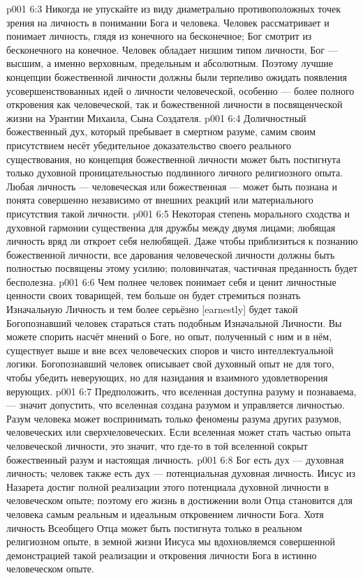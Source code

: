 \vs p001 6:3 Никогда не упускайте из виду диаметрально противоположных точек зрения на личность в понимании Бога и человека. Человек рассматривает и понимает личность, глядя из конечного на бесконечное; Бог смотрит из бесконечного на конечное. Человек обладает низшим типом личности, Бог --- высшим, а именно верховным, предельным и абсолютным. Поэтому лучшие концепции божественной личности должны были терпеливо ожидать появления усовершенствованных идей о личности человеческой, особенно --- более полного откровения как человеческой, так и божественной личности в посвященческой жизни на Урантии Михаила, Сына Создателя.
\vs p001 6:4 \pc Доличностный божественный дух, который пребывает в смертном разуме, самим своим присутствием несёт убедительное доказательство своего реального существования, но концепция божественной личности может быть постигнута только духовной проницательностью подлинного личного религиозного опыта. Любая личность --- человеческая или божественная --- может быть познана и понята совершенно независимо от внешних реакций или материального присутствия такой личности.
\vs p001 6:5 Некоторая степень морального сходства и духовной гармонии существенна для дружбы между двумя лицами; любящая личность вряд ли откроет себя нелюбящей. Даже чтобы приблизиться к познанию божественной личности, все дарования человеческой личности должны быть полностью посвящены этому усилию; половинчатая, частичная преданность будет бесполезна.
\vs p001 6:6 Чем полнее человек понимает себя и ценит личностные ценности своих товарищей, тем больше он будет стремиться познать Изначальную Личность и тем более серьёзно [earnestly] будет такой Богопознавший человек стараться стать подобным Изначальной Личности. Вы можете спорить насчёт мнений о Боге, но опыт, полученный с ним и в нём, существует выше и вне всех человеческих споров и чисто интеллектуальной логики. Богопознавший человек описывает свой духовный опыт не для того, чтобы убедить неверующих, но для назидания и взаимного удовлетворения верующих.
\vs p001 6:7 \pc Предположить, что вселенная доступна разуму и познаваема, --- значит допустить, что вселенная создана разумом и управляется личностью. Разум человека может воспринимать только феномены разума других разумов, человеческих или сверхчеловеческих. Если вселенная может стать частью опыта человеческой личности, это значит, что где\hyp{}то в той вселенной сокрыт божественный разум и настоящая личность.
\vs p001 6:8 \pc Бог есть дух --- духовная личность; человек также есть дух --- потенциальная духовная личность. Иисус из Назарета достиг полной реализации этого потенциала духовной личности в человеческом опыте; поэтому его жизнь в достижении воли Отца становится для человека самым реальным и идеальным откровением личности Бога. Хотя личность Всеобщего Отца может быть постигнута только в реальном религиозном опыте, в земной жизни Иисуса мы вдохновляемся совершенной демонстрацией такой реализации и откровения личности Бога в истинно человеческом опыте.
